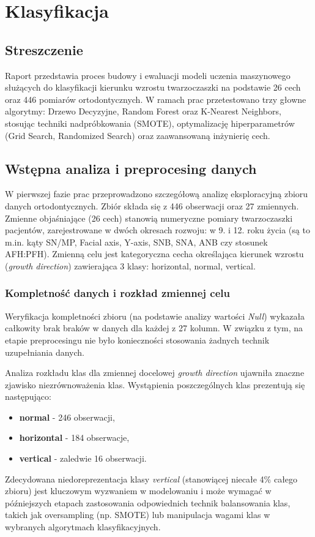 \documentclass[12pt, a4paper]{article}
\begin{document}
\section{Klasyfikacja}

\subsection{Streszczenie}

Raport przedstawia proces budowy i ewaluacji modeli uczenia maszynowego służących do klasyfikacji kierunku wzrostu twarzoczaszki na podstawie 26 cech oraz 446 pomiarów ortodontycznych. W ramach prac przetestowano trzy głowne algorytmy: Drzewo Decyzyjne, Random Forest oraz K-Nearest Neighbors, stosując techniki nadpróbkowania (SMOTE), optymalizację hiperparametrów (Grid Search, Randomized Search) oraz zaawansowaną inżynierię cech.

\subsection{Wstępna analiza i preprocesing danych}

W pierwszej fazie prac przeprowadzono szczegółową analizę eksploracyjną zbioru danych ortodontycznych. Zbiór składa się z 446 obserwacji oraz 27 zmiennych. Zmienne objaśniające (26 cech) stanowią numeryczne pomiary twarzoczaszki pacjentów, zarejestrowane w dwóch okresach rozwoju: w 9. i 12. roku życia (są to m.in. kąty SN/MP, Facial axis, Y-axis, SNB, SNA, ANB czy stosunek AFH:PFH). Zmienną celu jest kategoryczna cecha określająca kierunek wzrostu (\textit{growth direction}) zawierająca 3 klasy: horizontal, normal, vertical.

\subsubsection{Kompletność danych i rozkład zmiennej celu}

Weryfikacja kompletności zbioru (na podstawie analizy wartości \textit{Null}) wykazała całkowity brak braków w danych dla każdej z 27 kolumn. W związku z tym, na etapie preprocesingu nie było konieczności stosowania żadnych technik uzupełniania danych.

Analiza rozkładu klas dla zmiennej docelowej \textit{growth direction} ujawniła znaczne zjawisko niezrównoważenia klas. Wystąpienia poszczególnych klas prezentują się następująco:
\begin{itemize}
    \item \textbf{normal} - 246 obserwacji,
    \item \textbf{horizontal} - 184 obserwacje,
    \item \textbf{vertical} - zaledwie 16 obserwacji.
\end{itemize}
Zdecydowana niedoreprezentacja klasy \textit{vertical} (stanowiącej niecałe 4\% całego zbioru) jest kluczowym wyzwaniem w modelowaniu i może wymagać w późniejszych etapach zastosowania odpowiednich technik balansowania klas, takich jak oversampling (np. SMOTE) lub manipulacja wagami klas w wybranych algorytmach klasyfikacyjnych.
\end{document}
